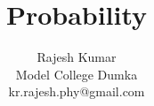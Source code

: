 \documentclass{beamer}
\begin{document}
\title{Probability}
\author{Rajesh Kumar \\Model College Dumka\\kr.rajesh.phy@gmail.com}
\date{}

\begin{frame}
  \titlepage
\end{frame}










\end{document}
